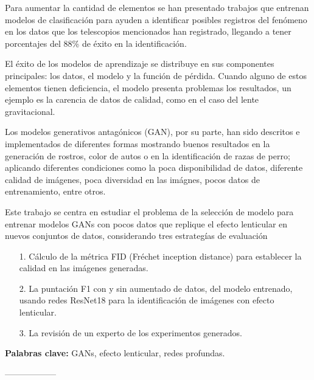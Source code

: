 \documentclass[letterpaper,12pt,oneside]{book}
\begin{document}
                Para aumentar la cantidad de elementos se han presentado trabajos que entrenan modelos de clasificación para  ayuden a identificar posibles registros del fenómeno en los datos que los telescopios mencionados han registrado, llegando a tener porcentajes del 88\% de éxito en la identificación.

                El éxito de los modelos de aprendizaje se distribuye en sus componentes principales: los datos, el modelo y la función de pérdida. Cuando alguno de estos elementos tienen deficiencia, el modelo presenta problemas los resultados, un ejemplo es la carencia de datos de calidad, como en el caso del lente gravitacional. 

                Los modelos generativos antagónicos (GAN), por su parte, han sido descritos e implementados de diferentes formas mostrando buenos resultados en la generación de rostros, color de autos o en la identificación de razas de perro; aplicando diferentes condiciones como la poca disponibilidad de datos, diferente calidad de imágenes, poca diversidad en las imágnes, pocos datos de entrenamiento, entre otros.

                Este trabajo se centra en estudiar el problema de la selección de modelo para entrenar modelos GANs con pocos datos que replique el efecto lenticular en nuevos conjuntos de datos, considerando tres estrategías de evaluación 
                \begin{itemize}
                    \item[1.] Cálculo de la métrica FID (Fréchet inception distance) para establecer la calidad en las imágenes generadas. 
                    \item[2.] La puntación F1 con y sin aumentado de datos, del modelo entrenado, usando redes ResNet18 para la identificación de imágenes con efecto lenticular.
                    \item[3.] La revisión de un experto de los experimentos generados.  
                \end{itemize}

                {\bf Palabras clave:} GANs, efecto lenticular, redes profundas.


                
                ------------------\\
                \vspace{0.5cm}
                
\end{document}
